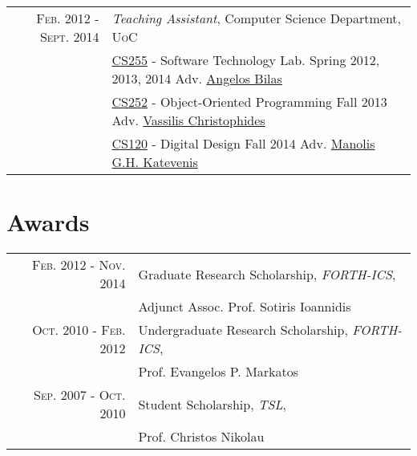 \documentclass[a4paper,10pt]{article} %
\begin{document}
\begin{tabular}{rl}

\textsc{Feb. 2012 - Sept. 2014} & \emph{Teaching Assistant}, Computer Science Department, \textsc{UoC} \\
& \href{https://www.csd.uoc.gr/CSD/index.jsp?content=courses_catalog&course=19}{CS255} - Software Technology Lab. \small Spring 2012, 2013, 2014 Adv. \href{https://users.ics.forth.gr/~bilas/}{Angelos Bilas} \\
& \href{https://www.csd.uoc.gr/~hy252/html/instructional_material.html}{CS252} - Object-Oriented Programming \small Fall 2013 Adv. \href{https://www.ics.forth.gr/person/Christophides/Vassilis}{Vassilis Christophides} \\
& \href{https://www.csd.uoc.gr/~hy120/18f/engl_cont.html}{CS120} - Digital Design \small Fall 2014 Adv. \href {https://users.ics.forth.gr/~kateveni/}{Manolis G.H. Katevenis}
\\

\end{tabular}


\section{Awards}

\begin{tabular}{rl}

\textsc{Feb. 2012 - Nov. 2014} & Graduate Research Scholarship, \emph{FORTH-ICS}, \\
& Adjunct Assoc. Prof. Sotiris Ioannidis \\

\textsc{Oct. 2010 - Feb. 2012} & Undergraduate Research Scholarship, \emph{FORTH-ICS}, \\
& Prof. Evangelos P.  Markatos \\


\textsc{Sep. 2007 - Oct. 2010} & Student Scholarship, \emph{TSL}, \\
& Prof. Christos Nikolau \\

\end{tabular}

\end{document}
